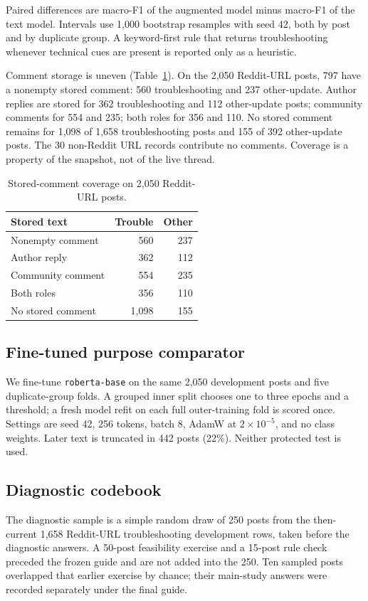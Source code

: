 \documentclass[conference,letterpaper]{IEEEtran}
\begin{document}
Paired differences are macro-F1 of the augmented model minus macro-F1 of the text model. Intervals use 1,000 bootstrap resamples with seed 42, both by post and by duplicate group. A keyword-first rule that returns troubleshooting whenever technical cues are present is reported only as a heuristic.

Comment storage is uneven (Table~\ref{tab:cov}). On the 2,050 Reddit-URL posts, 797 have a nonempty stored comment: 560 troubleshooting and 237 other-update. Author replies are stored for 362 troubleshooting and 112 other-update posts; community comments for 554 and 235; both roles for 356 and 110. No stored comment remains for 1,098 of 1,658 troubleshooting posts and 155 of 392 other-update posts. The 30 non-Reddit URL records contribute no comments. Coverage is a property of the snapshot, not of the live thread.

\begin{table}[t]
\caption{Stored-comment coverage on 2,050 Reddit-URL posts.}
\label{tab:cov}
\centering
\footnotesize
\setlength{\tabcolsep}{4pt}
\begin{tabular}{lrr}
\toprule
Stored text & Trouble & Other \\
\midrule
Nonempty comment & 560 & 237 \\
Author reply & 362 & 112 \\
Community comment & 554 & 235 \\
Both roles & 356 & 110 \\
No stored comment & 1,098 & 155 \\
\bottomrule
\end{tabular}
\end{table}

\subsection{Fine-tuned purpose comparator}
We fine-tune \texttt{roberta-base} \cite{Liu2019RoBERTa} on the same 2,050 development posts and five duplicate-group folds. A grouped inner split chooses one to three epochs and a threshold; a fresh model refit on each full outer-training fold is scored once. Settings are seed 42, 256 tokens, batch 8, AdamW at $2\times10^{-5}$, and no class weights. Later text is truncated in 442 posts (22\%). Neither protected test is used.

\subsection{Diagnostic codebook}
The diagnostic sample is a simple random draw of 250 posts from the then-current 1,658 Reddit-URL troubleshooting development rows, taken before the diagnostic answers. A 50-post feasibility exercise and a 15-post rule check preceded the frozen guide and are not added into the 250. Ten sampled posts overlapped that earlier exercise by chance; their main-study answers were recorded separately under the final guide.
\end{document}
